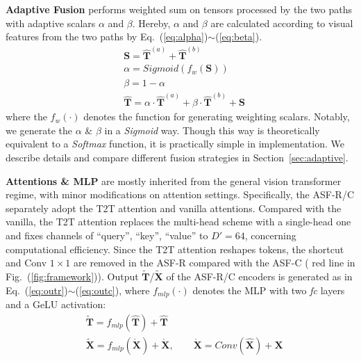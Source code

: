 \documentclass[lettersize,journal]{IEEEtran}
\begin{document}
\textbf{Adaptive Fusion} performs weighted sum on tensors processed by the two paths with adaptive scalars $\alpha$ and $\beta$. Hereby, $\alpha$ and $\beta$ are calculated according to visual features from the two paths by Eq.~(\ref{eq:alpha})$\sim$(\ref{eq:beta}). 
\begin{align}
    &\boldsymbol{S}=  \boldsymbol{\hat{T}}^{(a)} + \boldsymbol{\hat{T}}^{(b)} \\
    & \alpha= Sigmoid\left(f_{w}\left(\boldsymbol{S}\right)\right)\label{eq:alpha}\\
    & \beta = 1-\alpha\label{eq:beta}\\
    &\boldsymbol{\hat{T}}= \alpha \cdot \boldsymbol{\hat{T}}^{(a)} + \beta \cdot \boldsymbol{\hat{T}}^{(b)} + \boldsymbol{S}
\end{align}
where the $f_w\left(\cdot\right)$ denotes the function for generating weighting scalars. Notably, we generate the $\alpha$ \& $\beta$ in a \textit{Sigmoid} way. Though this way is theoretically equivalent to a \textit{Softmax} function, it is practically simple in implementation. We describe details and compare different fusion strategies in Section~\ref{sec:adaptive}.

\textbf{Attentions \& MLP} are mostly inherited from the general vision transformer regime, with minor modifications on attention settings. Specifically, the ASF-R/C separately adopt the T2T attention and vanilla attentions. Compared with the vanilla, the T2T attention replaces the multi-head scheme with a single-head one and fixes channels of ``query'', ``key'', ``value'' to $D'=64$, concerning computational efficiency. Since the T2T attention reshapes tokens, the shortcut and Conv $1\times1$ are removed in the ASF-R compared with the ASF-C ({\color{red} red} line in Fig.~(\ref{fig:framework})). Output $\boldsymbol{\widetilde{T}}$/$\boldsymbol{\widetilde{X}}$ of the ASF-R/C encoders is generated as in Eq.~(\ref{eq:outr})$\sim$(\ref{eq:outc}), where $f_{mlp}\left(\cdot\right)$ denotes the MLP with two \textit{fc} layers and a GeLU activation:
\begin{align}
    &\boldsymbol{\widetilde{T}}= f_{mlp}\left(\boldsymbol{\hat{T}}\right) + \boldsymbol{\hat{T}}\label{eq:outr}\\
&\boldsymbol{\widetilde{X}}= f_{mlp}\left(\boldsymbol{\mathring{X}}\right) + \boldsymbol{\mathring{X}}, \qquad \boldsymbol{\mathring{X}}= Conv\left(\boldsymbol{\hat{X}}\right) + \boldsymbol{X}\label{eq:outc}
\end{align}
\end{document}
